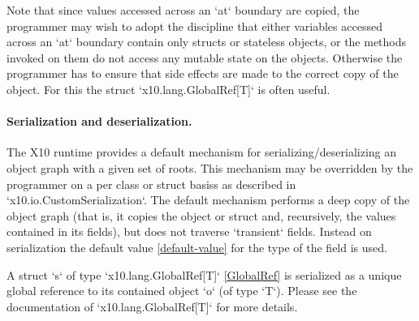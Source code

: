 Note that since values accessed across an \xcd`at` boundary are
copied, the programmer may wish to adopt the discipline that either
variables accessed across an \xcd`at` boundary  contain only structs 
or stateless objects, or the methods invoked on them do not access any
mutable state on the objects. Otherwise the programmer has to ensure
that side effects are made to the correct copy of the object. For this
the struct \xcd`x10.lang.GlobalRef[T]` is often useful.

\paragraph{Serialization and deserialization.}
The X10 runtime provides a default mechanism for
serializing/deserializing an object graph with a given set of roots.
This mechanism may be overridden by the programmer on a per class or
struct basiss as described in \xcd`x10.io.CustomSerialization`. 
The default mechanism performs a
deep copy of the object graph (that is, it copies the object or struct
and, recursively, the values contained in its fields), but does not
traverse \xcd`transient` fields. Instead on serialization the default
value \ref{default-value} for the type of the field is used.

A struct \xcd`s` of type \xcd`x10.lang.GlobalRef[T]` \ref{GlobalRef}
is serialized as a unique global reference to its contained object
\xcd`o` (of type \xcd`T`).  Please see the documentation
of \xcd`x10.lang.GlobalRef[T]` for more details.


